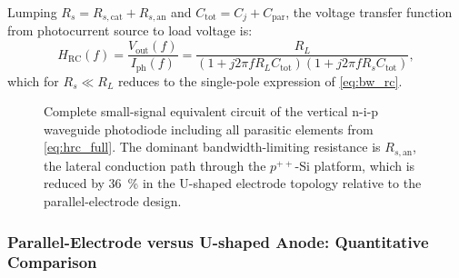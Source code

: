 Lumping $R_s=R_{s,\mathrm{cat}}+R_{s,\mathrm{an}}$ and
$C_{\mathrm{tot}}=C_j+C_{\mathrm{par}}$, the voltage transfer function from
photocurrent source to load voltage is:
\begin{equation}
    H_{\mathrm{RC}}(f)
    = \frac{V_{\mathrm{out}}(f)}{I_{\mathrm{ph}}(f)}
    = \frac{R_L}{(1+j2\pi f R_L C_{\mathrm{tot}})(1+j2\pi f R_s C_{\mathrm{tot}})},
    \label{eq:hrc_full}
\end{equation}
which for $R_s\ll R_L$ reduces to the single-pole expression of \cref{eq:bw_rc}.

\begin{figure}[H]
\centering
{}
\caption{Complete small-signal equivalent circuit of the vertical n-i-p waveguide
photodiode including all parasitic elements from \cref{eq:hrc_full}. The dominant
bandwidth-limiting resistance is $R_{s,\mathrm{an}}$, the lateral conduction path
through the $p^{++}$-Si platform, which is reduced by \SI{36}{\percent} in the
U-shaped electrode topology relative to the parallel-electrode design.}
\label{fig:eq_circuit}
\end{figure}

\subsubsection{Parallel-Electrode versus U-shaped Anode: Quantitative Comparison}
\label{subsec:pd_electrode_compare}

